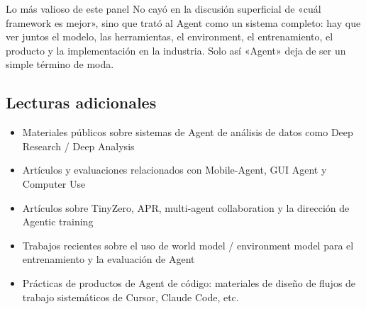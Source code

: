 \begin{importantbox}{Lo más valioso de este panel}
No cayó en la discusión superficial de «cuál framework es mejor», sino que trató al Agent como un sistema completo: hay que ver juntos el modelo, las herramientas, el environment, el entrenamiento, el producto y la implementación en la industria. Solo así «Agent» deja de ser un simple término de moda.
\end{importantbox}

\subsection{Lecturas adicionales}
\begin{itemize}
  \item Materiales públicos sobre sistemas de Agent de análisis de datos como Deep Research / Deep Analysis
  \item Artículos y evaluaciones relacionados con Mobile-Agent, GUI Agent y Computer Use
  \item Artículos sobre TinyZero, APR, multi-agent collaboration y la dirección de Agentic training
  \item Trabajos recientes sobre el uso de world model / environment model para el entrenamiento y la evaluación de Agent
  \item Prácticas de productos de Agent de código: materiales de diseño de flujos de trabajo sistemáticos de Cursor, Claude Code, etc.
\end{itemize}


